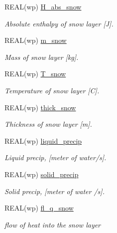 \begin{DoxyCompactItemize}
REAL(wp) \hyperlink{namespacemo__data_a01f72ce0ba7168d410a2a683c2579e2d}{H\_\-abs\_\-snow}
\begin{DoxyCompactList}\small\item\em Absolute enthalpy of snow layer \mbox{[}J\mbox{]}. \item\end{DoxyCompactList}\item 
REAL(wp) \hyperlink{namespacemo__data_abda43178412f35b4871bbfe89bc3eb12}{m\_\-snow}
\begin{DoxyCompactList}\small\item\em Mass of snow layer \mbox{[}kg\mbox{]}. \item\end{DoxyCompactList}\item 
REAL(wp) \hyperlink{namespacemo__data_a6d032201ee2f7b716badb13643daf93e}{T\_\-snow}
\begin{DoxyCompactList}\small\item\em Temperature of snow layer \mbox{[}C\mbox{]}. \item\end{DoxyCompactList}\item 
REAL(wp) \hyperlink{namespacemo__data_a21342bcdb92f398a57a8eef77c77191a}{thick\_\-snow}
\begin{DoxyCompactList}\small\item\em Thickness of snow layer \mbox{[}m\mbox{]}. \item\end{DoxyCompactList}\item 
REAL(wp) \hyperlink{namespacemo__data_ace52326d57ce881a5017a47fed1c5a17}{liquid\_\-precip}
\begin{DoxyCompactList}\small\item\em Liquid precip, \mbox{[}meter of water/s\mbox{]}. \item\end{DoxyCompactList}\item 
REAL(wp) \hyperlink{namespacemo__data_a4dee26c05c4bcb3d685c7a24ba41bf63}{solid\_\-precip}
\begin{DoxyCompactList}\small\item\em Solid precip, \mbox{[}meter of water /s\mbox{]}. \item\end{DoxyCompactList}\item 
REAL(wp) \hyperlink{namespacemo__data_ab90ffe7683553449ecf8c78d478cb40e}{fl\_\-q\_\-snow}
\begin{DoxyCompactList}\small\item\em flow of heat into the snow layer \item\end{DoxyCompactList}\item 

\end{DoxyCompactItemize}
